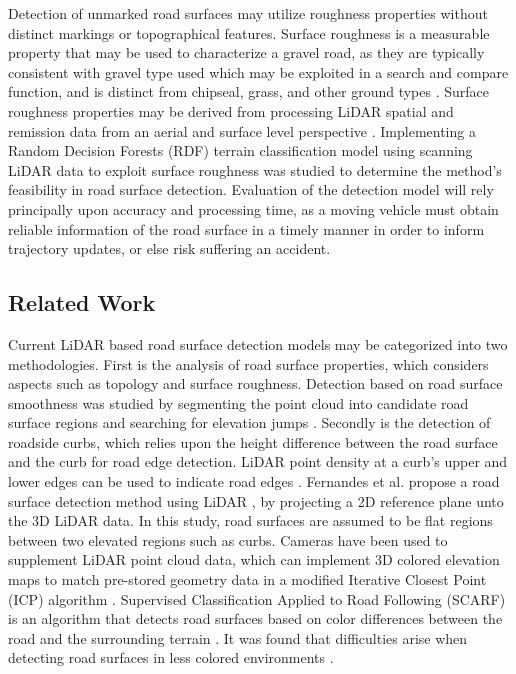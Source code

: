 \documentclass[journal,onecolumn]{IEEEtran}
\begin{document}
	{Detection of unmarked road surfaces may utilize roughness properties without distinct markings or topographical features. Surface roughness is a measurable property that may be used to characterize a gravel road, as they are typically consistent with gravel type used \cite{skorseth_gravel_nodate} which may be exploited in a search and compare function, and is distinct from chipseal, grass, and other ground types \cite{wan_road_2007, levi_3d_2012_light, levi_3d_2012_terrain}. Surface roughness properties may be derived from processing LiDAR spatial and remission data from an aerial and surface level perspective \cite{wan_road_2007, levi_3d_2012_light, levi_3d_2012_terrain, pollyea_experimental_2012,rychkov_computational_2012,lague_accurate_2013,brubaker_use_2013,turner_estimation_2014,campbell_lidar-based_2017,shepard_roughness_2001,tegowski_statistical_2016,sock_probabilistic_2016,milenkovic_roughness_2018,yadav_extraction_2017, yadav_rural_2018}. Implementing a Random Decision Forests (RDF) terrain classification model using scanning LiDAR data to exploit surface roughness was studied to determine the method's feasibility in road surface detection. Evaluation of the detection model will rely principally upon accuracy and processing time, as a moving vehicle must obtain reliable information of the road surface in a timely manner in order to inform trajectory updates, or else risk suffering an accident.}
	
	\subsection{Related Work}
	
	{Current LiDAR based road surface detection models may be categorized into two methodologies. First is the analysis of road surface properties, which considers aspects such as topology and surface roughness. Detection based on road surface smoothness was studied by segmenting the point cloud into candidate road surface regions and searching for elevation jumps \cite{liu_new_2013}. Secondly is the detection of roadside curbs, which relies upon the height difference between the road surface and the curb for road edge detection. LiDAR point density at a curb's upper and lower edges can be used to indicate road edges \cite{ibrahim_curb-based_2012}. Fernandes et al. propose a road surface detection method using LiDAR \cite{fernandes_road_2014}, by projecting a 2D reference plane unto the 3D LiDAR data. In this study, road surfaces are assumed to be flat regions between two elevated regions such as curbs. Cameras have been used to supplement LiDAR point cloud data, which can implement 3D colored elevation maps to match pre-stored geometry data in a modified Iterative Closest Point (ICP) algorithm \cite{manz_detection_2011}. Supervised Classification Applied to Road Following (SCARF) is an algorithm that detects road surfaces based on color differences between the road and the surrounding terrain \cite{crisman_scarf_1993}. It was found that difficulties arise when detecting road surfaces in less colored environments \cite{crisman_scarf_1993,manz_detection_2011}.}
	
\end{document}
